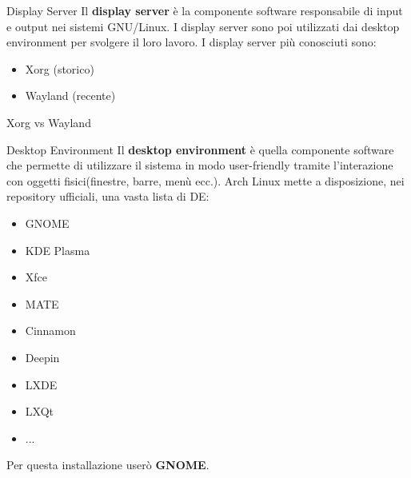 \begin{frame}{Display Server}
    Il \textbf{display server} è la componente software responsabile di input e output nei sistemi GNU/Linux.
    I display server sono poi utilizzati dai desktop environment per svolgere il loro lavoro.
    I display server più conosciuti sono:
    \begin{itemize}
        \item Xorg (storico)
        \item Wayland (recente)
    \end{itemize}
\end{frame}

\begin{frame}{Xorg vs Wayland}

\end{frame}

\begin{frame}{Desktop Environment}
Il \textbf{desktop environment} è quella componente software che permette di utilizzare il sistema in modo user-friendly
tramite l'interazione con oggetti fisici(finestre, barre, menù ecc.). Arch Linux mette a disposizione, nei repository ufficiali,
una vasta lista di DE:
\begin{itemize}
    \item GNOME
    \item KDE Plasma
    \item Xfce
    \item MATE
    \item Cinnamon
    \item Deepin
    \item LXDE
    \item LXQt
    \item ...
\end{itemize}
Per questa installazione userò \textbf{GNOME}.
\end{frame}

